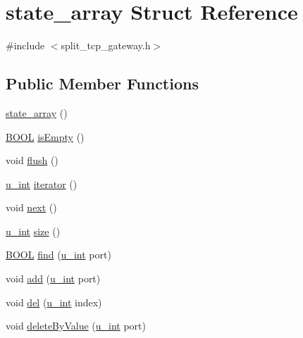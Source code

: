 \hypertarget{structstate__array}{\section{state\-\_\-array \-Struct \-Reference}
\label{structstate__array}
}


{\ttfamily \#include $<$split\-\_\-tcp\-\_\-gateway.\-h$>$}

\subsection*{\-Public \-Member \-Functions}
\begin{DoxyCompactItemize}
\item 
\hyperlink{structstate__array_a8f4ad00bb6cd0c60ceec45a7bb5e2fa8}{state\-\_\-array} ()
\item 
\hyperlink{split__tcp__gateway_8h_a050c65e107f0c828f856a231f4b4e788}{\-B\-O\-O\-L} \hyperlink{structstate__array_a4e9235c5a34ea3d49acd71a4680532de}{is\-Empty} ()
\item 
void \hyperlink{structstate__array_a1c8df30c95c0c53bdf327692bbd1485e}{flush} ()
\item 
\hyperlink{split__tcp__gateway_8h_ac319c165d52643e43249fe003e18bdf3}{u\-\_\-int} \hyperlink{structstate__array_a43f0ead49c43a420666d6987fa25ce72}{iterator} ()
\item 
void \hyperlink{structstate__array_a606d900f2b6b2c605177e6df2bc8d723}{next} ()
\item 
\hyperlink{split__tcp__gateway_8h_ac319c165d52643e43249fe003e18bdf3}{u\-\_\-int} \hyperlink{structstate__array_a8ab10b94f881ebd477e763f74c42318c}{size} ()
\item 
\hyperlink{split__tcp__gateway_8h_a050c65e107f0c828f856a231f4b4e788}{\-B\-O\-O\-L} \hyperlink{structstate__array_a1bbc64c3c548259b62d2cba589ec4964}{find} (\hyperlink{split__tcp__gateway_8h_ac319c165d52643e43249fe003e18bdf3}{u\-\_\-int} port)
\item 
void \hyperlink{structstate__array_adbcc0a5d7421099327ebef5cf4d3759f}{add} (\hyperlink{split__tcp__gateway_8h_ac319c165d52643e43249fe003e18bdf3}{u\-\_\-int} port)
\item 
void \hyperlink{structstate__array_ad2b4e53b6f6f9768be3702625741677f}{del} (\hyperlink{split__tcp__gateway_8h_ac319c165d52643e43249fe003e18bdf3}{u\-\_\-int} index)
\item 
void \hyperlink{structstate__array_a46f49bb35e00915fc4e6a82ae386506a}{delete\-By\-Value} (\hyperlink{split__tcp__gateway_8h_ac319c165d52643e43249fe003e18bdf3}{u\-\_\-int} port)
\end{DoxyCompactItemize}
